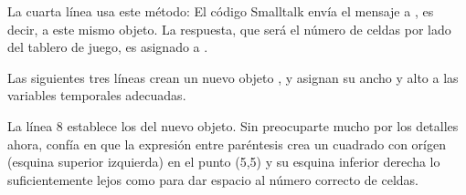 \documentclass[a4paper,10pt,twoside]{book}
\begin{document}
La cuarta l\'inea usa este m\'etodo:
El c\'odigo Smalltalk  env\'ia el mensaje  a , es decir, a este mismo objeto.
La respuesta, que ser\'a el n\'umero de celdas por lado del tablero de juego, es asignado a .

Las siguientes tres l\'ineas crean un nuevo objeto , y asignan su ancho y alto a las variables temporales adecuadas. 


La l\'inea 8 establece los  del nuevo objeto.
Sin preocuparte mucho por los detalles ahora, conf\'ia en que la expresi\'on entre par\'entesis crea un cuadrado con or\'igen (\ie esquina superior izquierda) en el punto (5,5) y su esquina inferior derecha lo suficientemente lejos como para dar espacio al n\'umero correcto de celdas.
\end{document}
